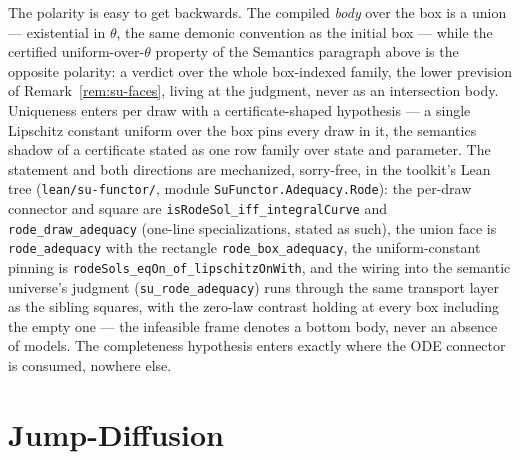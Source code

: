 The polarity is easy to get backwards. The compiled \emph{body} over the box is a union
--- existential in $\theta$, the same demonic convention as the
initial box --- while the certified uniform-over-$\theta$ property of
the Semantics paragraph above is the opposite polarity: a verdict
over the whole box-indexed family, the lower prevision of
Remark~\ref{rem:su-faces}, living at the judgment, never as an
intersection body. Uniqueness enters per draw with a
certificate-shaped hypothesis --- a single Lipschitz constant uniform
over the box pins every draw in it, the semantics shadow of a
certificate stated as one row family over state and parameter. The
statement and both directions are mechanized, sorry-free, in the
toolkit's Lean tree (\texttt{lean/su-functor/}, module
\texttt{SuFunctor.Adequacy.Rode}): the per-draw connector and square
are \texttt{isRodeSol\_iff\_integralCurve} and
\texttt{rode\_draw\_adequacy} (one-line specializations, stated as
such), the union face is \texttt{rode\_adequacy} with the rectangle
\texttt{rode\_box\_adequacy}, the uniform-constant pinning is
\texttt{rodeSols\_eqOn\_of\_lipschitzOnWith}, and the wiring into the
semantic universe's judgment (\texttt{su\_rode\_adequacy}) runs
through the same transport layer as the sibling squares, with the zero-law
contrast holding at every box including the empty one --- the
infeasible frame denotes a bottom body, never an absence of models.
The completeness hypothesis enters exactly where the ODE connector
is consumed, nowhere else.



\section{Jump-Diffusion}
\label{sec:mt-jumpdiff}

